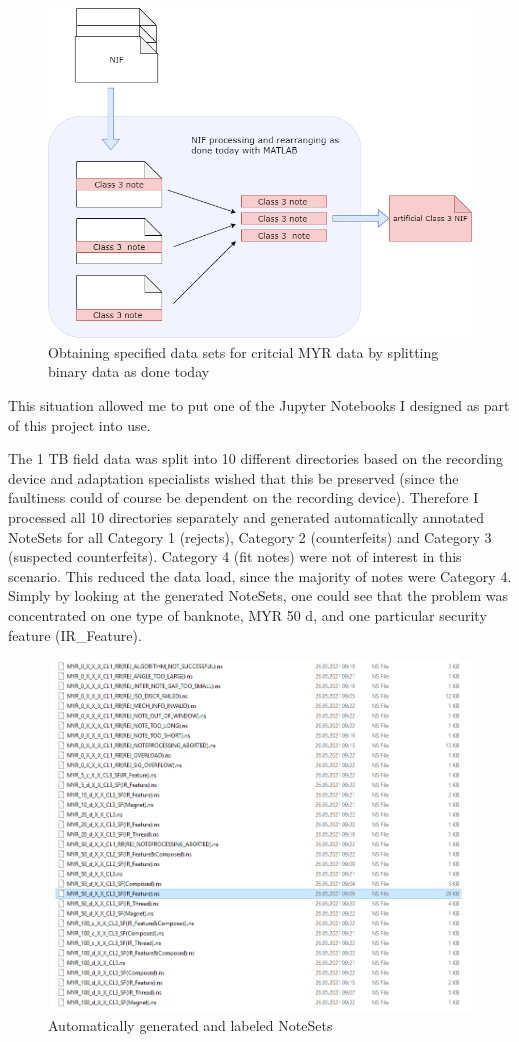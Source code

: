 \begin{figure}[!htb]
 \includegraphics[width=0.75\linewidth]{images/NIF_chopping.png}
 \caption{Obtaining specified data sets for critcial MYR data by splitting binary data as done today}\label{fig:NIF_chopping}
\end{figure}
This situation allowed me to put one of the Jupyter Notebooks I designed as part of this project into use.\par
The 1 TB field data was split into 10 different directories based on the recording device and adaptation specialists wished that this be preserved (since the faultiness could of course be dependent on the recording device). Therefore I processed all 10 directories separately and generated automatically annotated NoteSets for all Category 1 (rejects), Category 2 (counterfeits) and Category 3 (suspected counterfeits). Category 4 (fit notes) were not of interest in this scenario. This reduced the data load, since the majority of notes were Category 4. Simply by looking at the generated NoteSets, one could see that the problem was concentrated on one type of banknote, MYR 50 d,  and one particular security feature (IR\_Feature).
\begin{figure}[!htb]
 \includegraphics[width=0.75\linewidth]{images/myr_ns.png}
 \caption{Automatically generated and labeled NoteSets}\label{fig:myr_ns}
\end{figure} 

